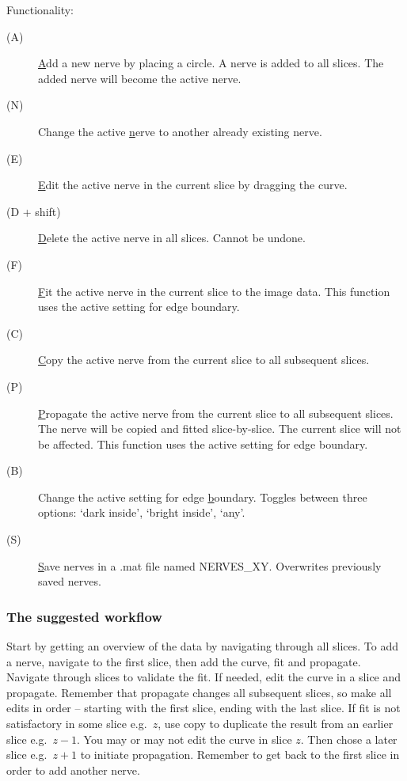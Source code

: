 \documentclass[paper=a4, fontsize=10pt]{article}
\begin{document}
Functionality:
\begin{description}
		\item[(A)] \underline{A}dd a new nerve by placing a circle. A nerve is added to all slices. The added nerve will become the active nerve.
		\item[(N)] Change the active \underline{n}erve to another already existing nerve. 
		\item[(E)] \underline{E}dit the active nerve in the current slice by dragging the curve.
		\item[(D + shift)] \underline{D}elete the active nerve in all slices. Cannot be undone.
		\item[(F)] \underline{F}it the active nerve in the current slice to the image data. This function uses the active setting for edge boundary. %
		\item[(C)] \underline{C}opy the active nerve from the current slice to all subsequent slices. %
		\item[(P)] \underline{P}ropagate the active nerve from the current slice to all subsequent slices. The nerve will be copied and fitted slice-by-slice. The current slice will not be affected. This function uses the active setting for edge boundary. %
		\item[(B)] Change the active setting for edge \underline{b}oundary. Toggles between three options: `dark inside', `bright inside', `any'.
		\item[(S)] \underline{S}ave nerves in a .mat file named NERVES\_XY. Overwrites previously saved nerves.
\end{description}

\subsubsection*{The suggested workflow}
Start by getting an overview of the data by navigating through all slices. To add a nerve, navigate to the first slice, then add the curve, fit and propagate. Navigate through slices to validate the fit. If needed, edit the curve in a slice and propagate. Remember that propagate changes all subsequent slices, so make all edits in order -- starting with the first slice, ending with the last slice. If fit is not satisfactory in some slice e.g.\ $z$, use copy to duplicate the result from an earlier slice e.g.\ $z-1$. You may or may not edit the curve in slice $z$. Then chose a later slice e.g.\ $z+1$ to initiate propagation. Remember to get back to the first slice in order to add another nerve.    
\end{document}
